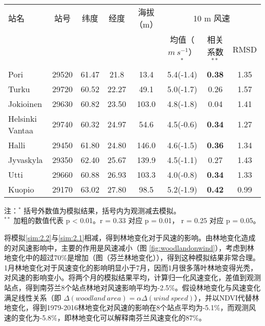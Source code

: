 \begin{table}[!htbp]
    \label{tab:Finlandstationinfo}
    \centering
    \small%
    \setlength{\tabcolsep}{5 pt}%
    \renewcommand{\arraystretch}{1.0}%
    \begin{tabular}{lccccccc}
        \hline
        站名 & 站号 & 纬度 & 经度 & 海拔（m）&  \multicolumn{3}{c}{10 m 风速} \\
         & & & & & 均值（$m ~ s^{-1}$）$^*$ &  相关系数 $^ {**}$ & RMSD \\
        \hline
        Pori & 29520 & 61.47 & 21.8 & 13.4 & 5.4(-1.4) & \textbf{0.38} & 1.35 \\
        Turku & 29720 & 60.52 & 22.27 & 49.1 & 5.0(-1.7) & 0.26 & 1.57 \\
        Jokioinen & 29630 & 60.82 & 23.50 & 103.0 & 4.8(-1.8) & 0.04 & 1.41 \\
        Helsinki Vantaa & 29740 & 60.32 & 24.97 & 54.6 & 4.5(-0.6) & \textbf{0.34} & 1.27 \\
        Halli & 29450 & 61.80 & 24.80 & 146.0 & 4.6(-1.5) & \textbf{0.36} & 1.34 \\
        Jyvaskyla & 29350 & 62.40 & 25.67 & 139.9 & 4.5(-1.1) & 0.27 & 1.43 \\
        Utti & 29660 & 60.88 & 26.93 & 103.3 & 4.0(-0.8) & \textbf{0.34} & 1.33 \\
        Kuopio & 29170 & 63.02 & 27.80 & 98.5 & 5.2(-1.9) & \textbf{0.42} & 0.99 \\ 
        \hline
    \end{tabular}
    
     \vspace*{3ex}  
      
    \begin{minipage}{1\textwidth}%
    注：$^*$ 括号外数值为模拟结果，括号内为观测减去模拟。\\ 
    $^{**}$ 加粗的数值代表 p < 0.01。r = 0.33 对应 p = 0.01， r = 0.25 对应 p = 0.05。
    \end{minipage}
\end{table}


将模拟\ref{sim:2.2}与\ref{sim:2.1}相减，得到林地变化对于风速的影响。由林地变化造成的对风速影响中，主要的作用是风速减小（图 \ref{fig:woodlandonwind}），考虑到林地变化中的超过70\%是增加（图（芬兰林地变化）），得到这种模拟结果非常合理。1月林地变化对于风速变化的影响明显小于7月，因而1月很多落叶林地变得光秃，对风速的影响变小。将两个月的模拟结果平均，计算归一化风速变化，差值到观测站点，得到南芬兰8个站点林地对风速影响平均为-2.5\%。假设林地变化与风速变化满足线性关系（即 $\Delta(woodland ~ area) = \alpha \Delta(wind ~ speed)$），并以NDVI代替林地变化，得到1979-2016林地变化对风速的影响在8个站点平均为-5.1\%，而观测风速的变化为-5.8\%，即林地变化可以解释南芬兰风速变化的87\%。

